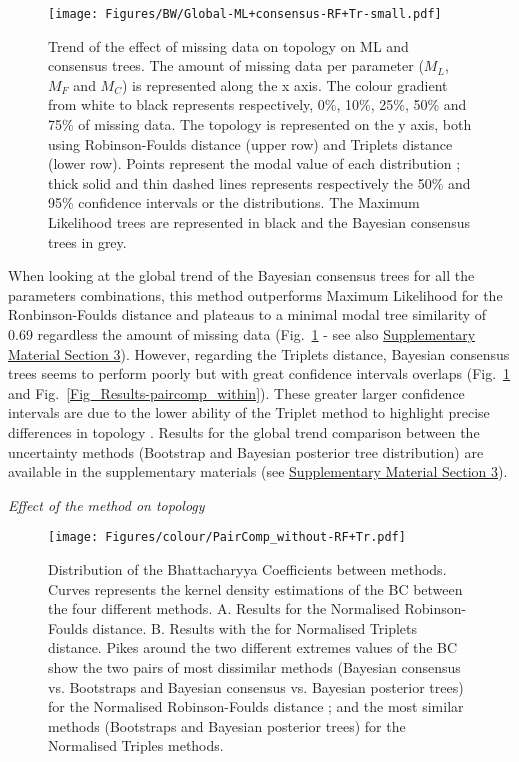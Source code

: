 \documentclass[12pt,letterpaper]{article}
\renewcommand{\subsection}[1]{%
\bigskip
\begin{center}
\begin{large}
\normalfont\itshape #1
\end{large}
\end{center}}
\begin{document}
\begin{figure} 
\centering
    \texttt{[image: Figures/BW/Global-ML+consensus-RF+Tr-small.pdf]}
\caption{Trend of the effect of missing data on topology on ML and consensus trees. The amount of missing data per parameter ($M_{L}$, $M_{F}$ and $M_{C}$) is represented along the x axis. The colour gradient from white to black represents respectively, 0\%, 10\%, 25\%, 50\% and 75\% of missing data. The topology is represented on the y axis, both using Robinson-Foulds distance (upper row) and Triplets distance (lower row). Points represent the modal value of each distribution ; thick solid and thin dashed lines represents respectively the 50\% and 95\% confidence intervals or the distributions. The Maximum Likelihood trees are represented in black and the Bayesian consensus trees in grey.}
\label{Fig_Results-global_perparam} %
\end{figure}

When looking at the global trend of the Bayesian consensus trees for all the parameters combinations, this method outperforms Maximum Likelihood for the Ronbinson-Foulds distance and plateaus to a minimal modal tree similarity of 0.69 regardless the amount of missing data (Fig.~\ref{Fig_Results-global_perparam} - see also \hyperref[SupplementaryMaterial]{Supplementary Material Section 3}). However, regarding the Triplets distance, Bayesian consensus trees seems to perform poorly but with great confidence intervals overlaps (Fig.~\ref{Fig_Results-global_perparam} and Fig.~\ref{Fig_Results-paircomp_within}). These greater larger confidence intervals are due to the lower ability of the Triplet method to highlight precise differences in topology \citep{kuhnerpractical2014}. Results for the global trend comparison between the uncertainty methods (Bootstrap and Bayesian posterior tree distribution) are available in the supplementary materials (see \hyperref[SupplementaryMaterial]{Supplementary Material Section 3}).

\subsection{Effect of the method on topology}

\begin{figure} 
\centering
    \texttt{[image: Figures/colour/PairComp\_without-RF+Tr.pdf]}
\caption{Distribution of the Bhattacharyya Coefficients between methods. Curves represents the kernel density estimations of the BC between the four different methods. A. Results for the Normalised Robinson-Foulds distance. B. Results with the for Normalised Triplets distance. Pikes around the two different extremes values of the BC show the two pairs of most dissimilar methods (Bayesian consensus vs. Bootstraps and Bayesian consensus vs. Bayesian posterior trees) for the Normalised Robinson-Foulds distance ; and the most similar methods (Bootstraps and Bayesian posterior trees) for the Normalised Triples methods.}
\label{Fig_Results-paircomp_without} %
\end{figure}
\end{document}
